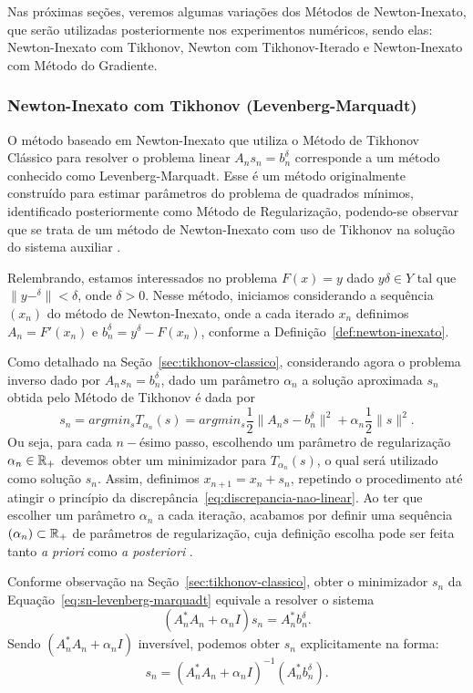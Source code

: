 Nas próximas seções, veremos algumas variações dos Métodos de Newton-Inexato, que serão utilizadas posteriormente nos experimentos numéricos, sendo elas: Newton-Inexato com Tikhonov, Newton com Tikhonov-Iterado e Newton-Inexato com Método do Gradiente.

\subsubsection{ Newton-Inexato com Tikhonov (Levenberg-Marquadt)}

O método baseado em Newton-Inexato que utiliza o Método de Tikhonov Clássico para resolver o problema linear $A_n s_n = b_n^\delta$ corresponde a um método conhecido como Levenberg-Marquadt. Esse é um método originalmente construído para estimar parâmetros do problema de quadrados mínimos, identificado posteriormente como Método de Regularização, podendo-se observar que se trata de um método de Newton-Inexato com uso de Tikhonov na solução do sistema auxiliar \cite{}.

Relembrando, estamos interessados no problema $F(x)=y$ dado $y\delta\in Y$ tal que $\|y-^\delta\| < \delta$, onde $\delta>0$. Nesse método, iniciamos considerando a sequência $(x_n)$ do método de Newton-Inexato, onde a cada iterado $x_n$ definimos $A_n = F'(x_n)$ e $b_n^\delta=y^\delta-F(x_n)$, conforme a Definição~\ref{def:newton-inexato}.

Como detalhado na Seção~\ref{sec:tikhonov-classico}, considerando agora o problema inverso dado por $A_n s_n = b_n^\delta$, dado um parâmetro $\alpha_n$ a solução aproximada $s_n$ obtida pelo Método de Tikhonov é dada por
\begin{equation}\label{eq:sn-levenberg-marquadt}
    s_n  = argmin_s T_{\alpha_n}(s) = argmin_s \frac{1}{2} \|A_n s - b_n^\delta \|^2 + \alpha_n \frac{1}{2} \|s\|^2.
\end{equation}
Ou seja, para cada $n-$ésimo passo, escolhendo um parâmetro de regularização $\alpha_n \in \mathbb{R}_+$ devemos obter um minimizador para $ T_{\alpha_n}(s)$, o qual será utilizado como solução $s_n$. Assim, definimos $x_{n+1}=x_n+s_n$, repetindo o procedimento até atingir o princípio da discrepância~\eqref{eq:discrepancia-nao-linear}. Ao ter que escolher um parâmetro $\alpha_n$ a cada iteração, acabamos por definir uma sequência $(\alpha_n) \subset \mathbb{R}_+$ de parâmetros de regularização, cuja definição escolha pode ser feita tanto \textit{a priori} como \textit{a posteriori} . 


Conforme observação na Seção~\ref{sec:tikhonov-classico}, obter o minimizador $s_n$ da Equação~\eqref{eq:sn-levenberg-marquadt} equivale a resolver o sistema
\[
(A_n^*A_n + \alpha_n I) s_n = A_n^* b_n^\delta.
\]
Sendo $(A_n^*A_n + \alpha_n I)$ inversível, podemos obter $s_n$ explicitamente na forma:
\begin{equation}
     s_n = (A_n^*A_n + \alpha_n I)^{-1}(A_n^* b_n^\delta).
\end{equation}

